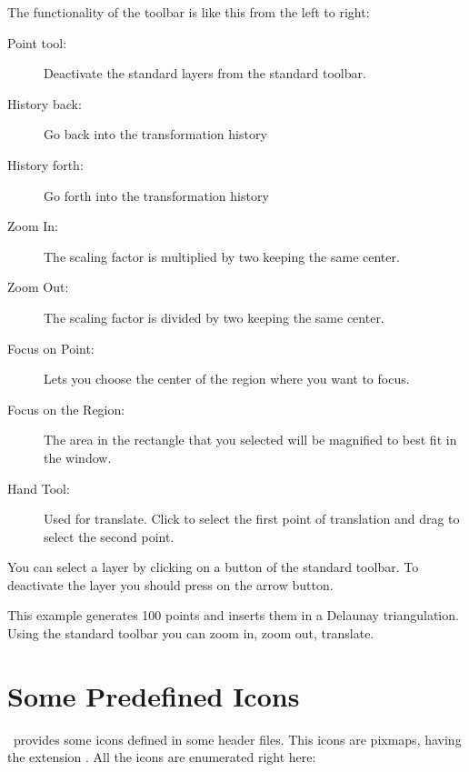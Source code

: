 The functionality of the toolbar is like this from the left to right:
\begin{description}
        \item[Point tool:] Deactivate the standard layers from the
standard toolbar.
	\item[History back:] Go back into the transformation history
	\item[History forth:] Go forth into the transformation history
        \item[Zoom In:] The scaling factor is multiplied by two
keeping the same center.
        \item[Zoom Out:] The scaling factor is divided by two keeping
the same center.
        \item[Focus on Point:] Lets you choose the center of the
region where you want to focus.
        \item[Focus on the Region:] The area in the rectangle that you selected will be magnified to best fit in the window.
        \item[Hand Tool:] Used for translate. Click to select the
first point of translation and drag to select the second point.
\end{description}

You can select a layer by clicking on a button of the standard
toolbar. To deactivate the layer you should press on the arrow button.

\ccExample
{}

This example generates 100 points and inserts them in a Delaunay
triangulation. Using the standard toolbar you can zoom in, zoom out,
translate.

\section{Some Predefined Icons}
\label{The predefined icons}

\cgal\ provides some icons defined in some header files. This icons are
pixmaps, having the extension . All the icons are enumerated right
here:





